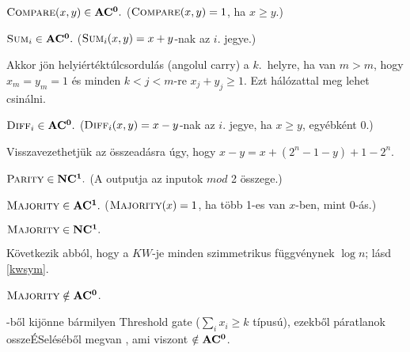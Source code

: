 \begin{Exercise}[counter={sorszam}, difficulty=0]
	$\mbox{\sc{Compare}}(x,y) \in \mbox{\ensuremath{\mathbf{AC^0}}}.$ ($\mbox{\sc{Compare}}(x,y)=1$, ha $x\geq y$.)
\end{Exercise}

\begin{Exercise}[counter={sorszam}, difficulty=0]
	$\mbox{\sc{Sum}}_i \in \mbox{\ensuremath{\mathbf{AC^0}}}.$
	($\mbox{\sc{Sum}}_i(x,y)=x+y$-nak az $i$. jegye.)
\end{Exercise}
\begin{Answer}
	Akkor j\"on helyiértéktúlcsordulás (angolul carry) a $k$.\ helyre, ha van $m>m$, hogy $x_m=y_m=1$ \'es minden $k<j<m$-re $x_j+y_j\ge 1$. Ezt h\'al\'ozattal meg lehet csin\'alni.
\end{Answer}

\begin{Exercise}[counter={sorszam}, difficulty=0]
	$\mbox{\sc{Diff}}_i \in \mbox{\ensuremath{\mathbf{AC^0}}}.$
	($\mbox{\sc{Diff}}_i(x,y)=x-y$-nak az $i$. jegye, ha $x\ge y$, egy\'ebk\'ent 0.)
\end{Exercise}
\begin{Answer}
	Visszavezethetj\"uk az \"osszead\'asra \'ugy, hogy $x-y=x+(2^n-1-y)+1-2^n$.
\end{Answer}

\begin{Exercise}[counter={sorszam}, difficulty=0]
	$\mbox{\sc{Parity}} \in \mbox{\ensuremath{\mathbf{NC^1}}}.$
	(A  outputja az inputok $mod$ 2 összege.)
\end{Exercise}

\begin{Exercise}[counter={sorszam}, difficulty=0]
	$\mbox{\sc{Majority}} \in \mbox{\ensuremath{\mathbf{AC^1}}}.$
	($\mbox{\sc{Majority}}(x)=1$, ha t\"obb 1-es van $x$-ben, mint 0-\'as.)
\end{Exercise}

\begin{Exercise}[counter={sorszam}, difficulty=1]
	$\mbox{\sc{Majority}} \in \mbox{\ensuremath{\mathbf{NC^1}}}.$
\end{Exercise}
\begin{Answer}
	K\"ovetkezik abb\'ol, hogy a $KW$-je minden szimmetrikus f\"uggv\'enynek $\log n$; l\'asd \ref{kwsym}.
\end{Answer}

\begin{Exercise}[counter={sorszam}, difficulty=0]
	$\mbox{\sc{Majority}}\notin\mbox{\ensuremath{\mathbf{AC^0}}}$.
\end{Exercise}
\begin{Answer}
	-b\H ol kij\"onne b\'armilyen Threshold gate ($\sum_i x_i\ge k$ t\'ipus\'u), ezekb\H ol p\'aratlanok ossze\'ESel\'es\'eb\H ol megvan , ami viszont $\notin\mbox{\ensuremath{\mathbf{AC^0}}}$.
\end{Answer}

